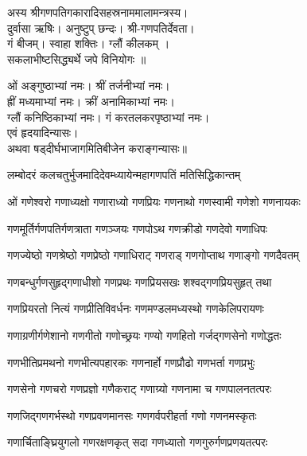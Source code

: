 

अस्य श्रीगणपतिगकारादिसहस्रनाममालामन्त्रस्य।\\
दुर्वासा ऋषिः। अनुष्टुप् छन्दः। श्री-गणपतिर्देवता।\\
गं बीजम्। स्वाहा शक्तिः। ग्लौं कीलकम् ।\\
 सकलाभीष्टसिद्ध्यर्थे जपे विनियोगः ॥

ओं अङ्गुष्ठाभ्यां नमः। श्रीं तर्जनीभ्यां नमः।\\
ह्रीं मध्यमाभ्यां नमः। क्रीं अनामिकाभ्यां नमः।\\
ग्लौं कनिष्ठिकाभ्यां नमः। गं करतलकरपृष्ठाभ्यां नमः।\\
एवं हृदयादिन्यासः।\\
अथवा षड्दीर्घभाजागमितिबीजेन कराङ्गन्यासः॥


{लम्बोदरं कलचतुर्भुजमादिदेवम्}{ध्यायेन्महागणपतिं मतिसिद्धिकान्तम्}


\twolineshloka
{ओं गणेश्वरो गणाध्यक्षो गणाराध्यो गणप्रियः}
{गणनाथो गणस्वामी गणेशो गणनायकः}%

\twolineshloka
{गणमूर्तिर्गणपतिर्गणत्राता गणञ्जयः}%
{गणपोऽथ गणक्रीडो गणदेवो गणाधिपः}%

\twolineshloka
{गणज्येष्ठो गणश्रेष्ठो गणप्रेष्ठो गणाधिराट्}%
{गणराड् गणगोप्ताथ गणाङ्गो गणदैवतम्}%

\twolineshloka
{गणबन्धुर्गणसुहृद्गणाधीशो गणप्रथः}%
{गणप्रियसखः शश्वद्गणप्रियसुहृत् तथा}%

\twolineshloka
{गणप्रियरतो नित्यं गणप्रीतिविवर्धनः}%
{गणमण्डलमध्यस्थो गणकेलिपरायणः}%

\twolineshloka
{गणाग्रणीर्गणेशानो गणगीतो गणोच्छ्रयः}%
{गण्यो गणहितो गर्जद्गणसेनो गणोद्धतः}%

\twolineshloka
{गणभीतिप्रमथनो गणभीत्यपहारकः}%
{गणनार्हो गणप्रौढो गणभर्ता गणप्रभुः}%

\twolineshloka
{गणसेनो गणचरो गणप्रज्ञो गणैकराट्}%
{गणाग्र्यो गणनामा च गणपालनतत्परः}%

\twolineshloka
{गणजिद्गणगर्भस्थो गणप्रवणमानसः}%
{गणगर्वपरीहर्ता गणो गणनमस्कृतः}%

\twolineshloka
{गणार्चिताङ्घ्रियुगलो गणरक्षणकृत् सदा}%
{गणध्यातो गणगुरुर्गणप्रणयतत्परः}%

